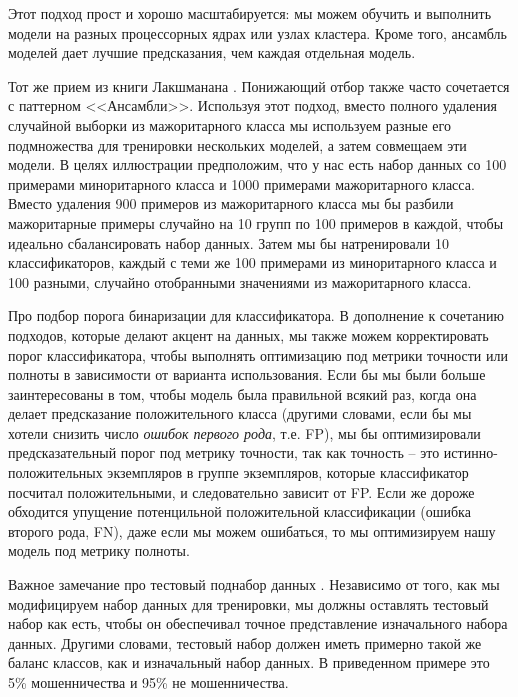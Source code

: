 \documentclass[%
	11pt,
	a4paper,
	utf8,
		]{article}
\begin{document}
Этот подход прост и хорошо масштабируется: мы можем обучить и выполнить модели на разных процессорных ядрах или узлах кластера. Кроме того, ансамбль моделей дает лучшие предсказания, чем каждая отдельная модель.

Тот же прием из книги Лакшманана \cite[]{lakshmanan-mldp:2022}. Понижающий отбор также часто сочетается с паттерном <<Ансамбли>>. Используя этот подход, вместо полного удаления случайной выборки из мажоритарного класса мы используем разные его подмножества для тренировки нескольких моделей, а затем совмещаем эти модели. В целях иллюстрации предположим, что у нас есть набор данных со 100 примерами миноритарного класса и 1000 примерами мажоритарного класса. Вместо удаления 900 примеров из мажоритарного класса мы бы разбили мажоритарные примеры случайно на 10 групп по 100 примеров в каждой, чтобы идеально сбалансировать набор данных. Затем мы бы натренировали 10 классификаторов, каждый с теми же 100 примерами из миноритарного класса и 100 разными, случайно отобранными значениями из мажоритарного класса.

Про подбор порога бинаризации для классификатора. В дополнение к сочетанию подходов, которые делают акцент на данных, мы также можем корректировать порог классификатора, чтобы выполнять оптимизацию под метрики точности или полноты в зависимости от варианта использования. Если бы мы были больше заинтересованы в том, чтобы модель была правильной всякий раз, когда она делает предсказание положительного класса (другими словами, если бы мы хотели снизить число \emph{ошибок первого рода}, т.е. FP), мы бы оптимизировали предсказательный порог под метрику точности, так как точность -- это истинно-положительных экземпляров в группе экземпляров, которые классификатор посчитал положительными, и следовательно зависит от FP. Если же дороже обходится упущение потенцильной положительной классификации (ошибка второго рода, FN), даже если мы можем ошибаться, то мы оптимизируем нашу модель под метрику полноты.

Важное замечание про тестовый поднабор данных \cite[]{lakshmanan-mldp:2022}. Независимо от того, как мы модифицируем набор данных для тренировки, мы должны оставлять тестовый набор как есть, чтобы он обеспечивал точное представление изначального набора данных. Другими словами, тестовый набор должен иметь примерно такой же баланс классов, как и изначальный набор данных. В приведенном примере это 5\% мошенничества и 95\% не мошенничества.
\end{document}
